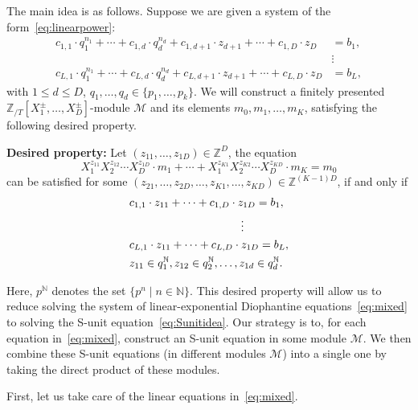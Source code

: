 \documentclass[letterpaper, 11pt, thm-restate]{article}
\numberwithin{equation}{section}
\newcommand{\Z}{\mathbb{Z}}
\newcommand{\N}{\mathbb{N}}
\newcommand{\ZT}{\mathbb{Z}_{/T}}
\newcommand{\mM}{\mathcal{M}}
\theoremstyle{definition}
\theoremstyle{definition}
\theoremstyle{definition}
\begin{document}
The main idea is as follows.
Suppose we are given a system of the form~\eqref{eq:linearpower}:
\begin{align*}
        c_{1,1} \cdot q_1^{n_1} + \cdots + c_{1,d} \cdot q_d^{n_d} + c_{1,d+1} \cdot z_{d+1} + \cdots + c_{1, D} \cdot z_{D} & = b_1, \nonumber \\
        & \vdots \nonumber \\
        c_{L,1} \cdot q_1^{n_1} + \cdots + c_{L,d} \cdot q_d^{n_d} + c_{L,d+1} \cdot z_{d+1} + \cdots + c_{L, D} \cdot z_{D} & = b_L,
\end{align*}
with $1 \leq d \leq D$, $q_1, \ldots, q_d \in \{p_1, \ldots, p_k\}$.
We will construct a finitely presented $\ZT[X_1^{\pm}, \ldots, X_D^{\pm}]$-module $\mM$ and its elements $m_0, m_1, \ldots, m_K$, satisfying the following desired property.

\textbf{Desired property:}
Let $(z_{11}, \ldots, z_{1D}) \in \Z^{D}$, the equation
\begin{equation}\label{eq:Sunitidea}
X_1^{z_{11}} X_2^{z_{12}} \cdots X_D^{z_{1D}} \cdot m_1 + \cdots + X_1^{z_{K1}} X_2^{z_{K2}} \cdots X_D^{z_{KD}} \cdot m_K = m_0
\end{equation}
can be satisfied for some $(z_{21}, \ldots, z_{2D}, \ldots, z_{K1}, \ldots,  z_{KD}) \in \Z^{(K-1)D}$, if and only if
\begin{align}\label{eq:mixed}
        & c_{1,1} \cdot z_{11} + \cdots + c_{1, D} \cdot z_{1D} = b_1, \nonumber\\
        & \hspace{3.5cm} \vdots \\
        & c_{L,1} \cdot z_{11} + \cdots + c_{L, D} \cdot z_{1D} = b_L, \nonumber\\
        & z_{11} \in q_1^{\N}, z_{12} \in q_2^{\N}, \ldots, z_{1d} \in q_d^{\N}. \nonumber
\end{align}

Here, $p^{\N}$ denotes the set $\{p^n \mid n \in \N\}$.
This desired property will allow us to reduce solving the system of linear-exponential Diophantine equations~\eqref{eq:mixed} to solving the S-unit equation~\eqref{eq:Sunitidea}.
Our strategy is to, for each equation in~\eqref{eq:mixed}, construct an S-unit equation in some module $\mM$.
We then combine these S-unit equations (in different modules $\mM$) into a single one by taking the direct product of these modules.

First, let us take care of the linear equations in~\eqref{eq:mixed}.
\end{document}
